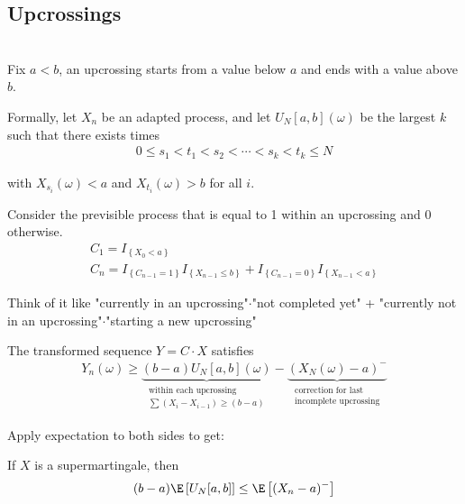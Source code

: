 \subsection{Upcrossings}\hfill\\
Fix $a<b$, an upcrossing starts from a value below $a$ and ends with a value above $b$.
\par\bigskip
\noindent Formally, let $X_n$ be an adapted process, and let $U_N[a,b](\omega)$ be the largest $k$ such that there exists times 
\begin{equation*}
  \begin{gathered}
    0\leq s_1<t_1<s_2<\cdots<s_k<t_k\leq N
  \end{gathered}
\end{equation*}\par
\noindent with $X_{s_i}(\omega)<a$ and $X_{t_i}(\omega)>b$ for all $i$.\par
\noindent Consider the previsible process that is equal to 1 within an upcrossing and 0 otherwise.
\begin{equation*}
  \begin{gathered}
  C_1 = I_{\left\{X_0<a\right\}}\\
  C_n = I_{\left\{C_{n-1}=1\right\}}I_{\left\{X_{n-1}\leq b\right\}} + I_{\left\{C_{n-1}=0\right\}}I_{\left\{X_{n-1}<a\right\}}
  \end{gathered}
\end{equation*}\par
\noindent Think of it like "currently in an upcrossing"$\cdot$"not completed yet" + "currently not in an upcrossing"$\cdot$"starting a new upcrossing"
\par\bigskip
\noindent The transformed sequence $Y = C\cdot X$ satisfies
\begin{equation*}
  \begin{gathered}
    Y_n(\omega)\geq\underbrace{(b-a)U_N[a,b](\omega)}_{\substack{\text{within each upcrossing}\\\sum(X_i-X_{i-1})\geq(b-a)}}-\underbrace{\left(X_N(\omega)-a\right)^-}_{\substack{\text{correction for last}\\\text{incomplete upcrossing}}}
  \end{gathered}
\end{equation*}\par
\noindent Apply expectation to both sides to get:
\par\bigskip
\begin{lem}{}
  If $X$ is a supermartingale, then
  \begin{equation*}
    \begin{gathered}
      (b-a)\E\left[U_N[a,b]\right]\leq \E\left[(X_n-a)^-\right]
    \end{gathered}
  \end{equation*}
\end{lem}
